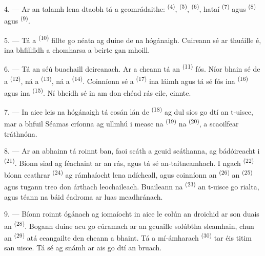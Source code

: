 4. --- Ar an talamh lena dtaobh tá  a gcomrádaithe: 
 \textsuperscript{(4)},  \textsuperscript{(5)},
 \textsuperscript{(6)}, hataí 
\textsuperscript{(7)} agus  \textsuperscript{(8)} agus
 \textsuperscript{(9)}.

5. --- Tá a  \textsuperscript{(10)} fillte go néata ag duine de
na hógánaigh. Cuireann sé ar thuáille é, ina bhfillfidh a chomharsa a
 beirte gan mhoill.

6. --- Tá an séú buachaill deireanach. Ar a cheann tá an 
\textsuperscript{(11)} fós. Níor bhain sé de a 
\textsuperscript{(12)}, ná a  \textsuperscript{(13)}, ná a
 \textsuperscript{(14)}. Coinníonn sé a 
\textsuperscript{(17)} ina láimh agus tá sé fós ina 
\textsuperscript{(16)} agus ina  \textsuperscript{(15)}. Ní
bheidh sé in am don chéad rás eile, cinnte.

7. --- In aice leis na hógánaigh tá cosán lán de 
\textsuperscript{(18)} ag dul síos go dtí an t-uisce, mar a bhfuil Séamas
críonna ag ullmhú i measc na  \textsuperscript{(19)} na
 \textsuperscript{(20)}, a scaoilfear tráthnóna.

\VUsaut{4.4mm}
\VUsaut{3.4mm}

8. --- Ar an abhainn tá roinnt ban, faoi scáth a gcuid scáthanna, ag bádóireacht i
 \textsuperscript{(21)}. Bíonn siad ag féachaint ar an rás, agus tá sé
an-taitneamhach. I ngach  \textsuperscript{(22)} bíonn ceathrar
 \textsuperscript{(24)} ag rámhaíocht lena ndícheall, agus
coinníonn an  \textsuperscript{(26)} an 
\textsuperscript{(25)} agus tugann treo don árthach leochaileach. Buaileann na
 \textsuperscript{(23)} an t-uisce go rialta, agus téann na
báid éadroma ar luas meadhránach.

9. --- Bíonn roinnt ógánach ag iomaíocht in aice le colún an droichid ar son duais
an  \textsuperscript{(28)}. Bogann duine acu go cúramach ar
an gcuaille solúbtha sleamhain, chun an 
\textsuperscript{(29)} atá ceangailte den cheann a bhaint. Tá a  mí-ámharach \textsuperscript{(30)} tar éis titim san uisce. Tá sé ag
snámh ar ais go dtí an bruach.

